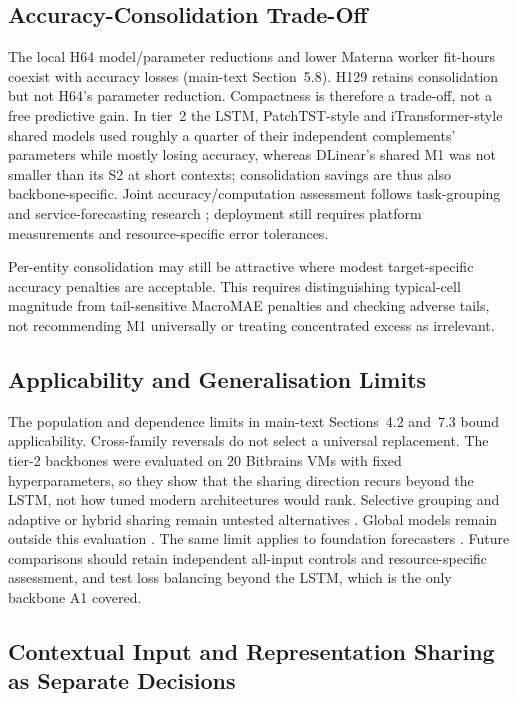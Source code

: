 \documentclass[a4paper,11pt]{article}
\begin{document}
\subsection*{Accuracy-Consolidation Trade-Off}


The local H64 model/parameter reductions and lower Materna worker fit-hours
coexist with accuracy losses (main-text Section~5.8).
H129 retains consolidation but not H64's parameter reduction. Compactness is
therefore a trade-off, not a free predictive gain. In tier~2 the LSTM,
PatchTST-style and iTransformer-style shared models used roughly a quarter
of their independent complements' parameters while mostly losing accuracy,
whereas DLinear's shared M1 was not smaller than its S2 at short contexts;
consolidation savings are thus also backbone-specific. Joint accuracy/computation
assessment follows task-grouping and service-forecasting research
\citep{Standley2020TaskGrouping,Syu2017DynamicQoS}; deployment still requires
platform measurements and resource-specific error tolerances.

Per-entity consolidation may still be attractive where modest target-specific
accuracy penalties are acceptable. This requires distinguishing typical-cell
magnitude from tail-sensitive MacroMAE penalties and checking adverse tails,
not recommending M1 universally or treating concentrated excess as irrelevant.

\subsection*{Applicability and Generalisation Limits}


The population and dependence limits in main-text Sections~4.2
and~7.3 bound applicability. Cross-family reversals do not
select a universal replacement. The tier-2 backbones were evaluated on 20
Bitbrains VMs with fixed hyperparameters, so they show that the sharing
direction recurs beyond the LSTM, not how tuned modern architectures would
rank. Selective grouping and adaptive or hybrid sharing remain untested
alternatives
\citep{Fifty2021TaskGroupings,Yu2020GradientSurgery,Nochumsohn2025MTLinear}.
Global models remain outside this evaluation
\citep{MonteroManso2021GlobalForecasting}.
The same limit applies to foundation forecasters
\citep{DiMenna2026RuntimeForecasting}. Future comparisons should retain
independent all-input controls and resource-specific assessment, and test
loss balancing beyond the LSTM, which is the only backbone A1 covered.

\subsection*{Contextual Input and Representation Sharing as Separate Decisions}
\end{document}
